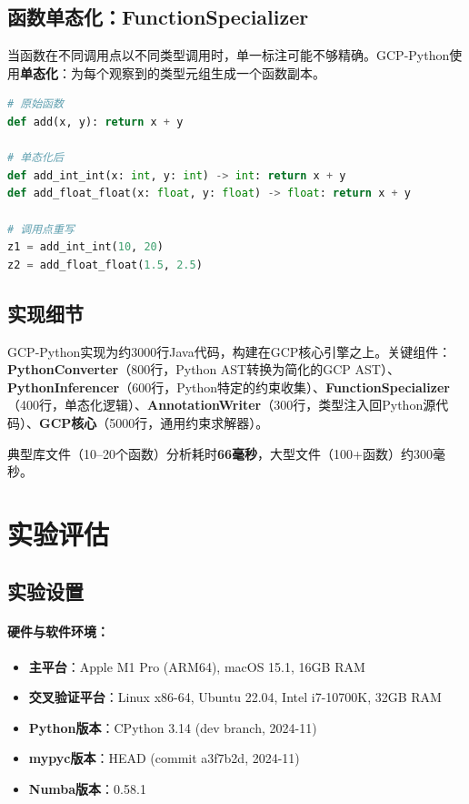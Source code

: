 \documentclass[UTF8]{article}
\begin{document}
\subsection{函数单态化：FunctionSpecializer}

当函数在不同调用点以不同类型调用时，单一标注可能不够精确。GCP-Python使用\textbf{单态化}：为每个观察到的类型元组生成一个函数副本。

\begin{lstlisting}[language=Python]
# 原始函数
def add(x, y): return x + y

# 单态化后
def add_int_int(x: int, y: int) -> int: return x + y
def add_float_float(x: float, y: float) -> float: return x + y

# 调用点重写
z1 = add_int_int(10, 20)
z2 = add_float_float(1.5, 2.5)
\end{lstlisting}

\subsection{实现细节}

GCP-Python实现为约3000行Java代码，构建在GCP核心引擎之上。关键组件：\textbf{PythonConverter}（800行，Python AST转换为简化的GCP AST）、\textbf{PythonInferencer}（600行，Python特定的约束收集）、\textbf{FunctionSpecializer}（400行，单态化逻辑）、\textbf{AnnotationWriter}（300行，类型注入回Python源代码）、\textbf{GCP核心}（5000行，通用约束求解器）。

典型库文件（10--20个函数）分析耗时\textbf{66毫秒}，大型文件（100+函数）约300毫秒。

\section{实验评估}
\label{sec:eval}

\subsection{实验设置}

\paragraph{硬件与软件环境：}
\begin{itemize}[leftmargin=2em]
\item \textbf{主平台}：Apple M1 Pro (ARM64), macOS 15.1, 16GB RAM
\item \textbf{交叉验证平台}：Linux x86-64, Ubuntu 22.04, Intel i7-10700K, 32GB RAM
\item \textbf{Python版本}：CPython 3.14 (dev branch, 2024-11)
\item \textbf{mypyc版本}：HEAD (commit a3f7b2d, 2024-11)
\item \textbf{Numba版本}：0.58.1
\end{itemize}
\end{document}
